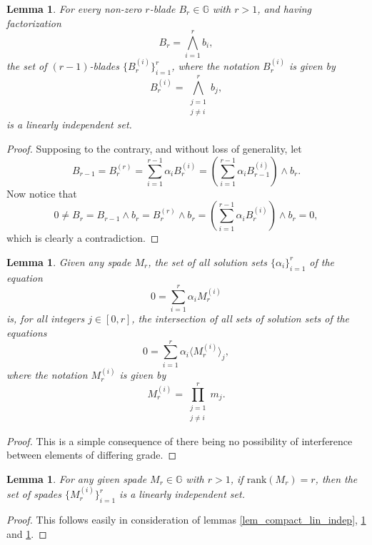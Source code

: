 \documentclass{birkjour}
\newtheorem{lem}[thm]{Lemma}
\theoremstyle{definition}
\theoremstyle{remark}
\numberwithin{equation}{section}
\newcommand{\G}{\mathbb{G}}
\newcommand{\rank}{\mbox{rank}}
\begin{document}
\begin{lem}\label{lem_lin_indep_subblades}
For every non-zero $r$-blade $B_r\in\G$ with $r>1$, and having factorization
\begin{equation*}
B_r = \bigwedge_{i=1}^r b_i,
\end{equation*}
the set of $(r-1)$-blades $\{B_r^{(i)}\}_{i=1}^r$, where the notation $B_r^{(i)}$ is given by
\begin{equation*}
B_r^{(i)}=\bigwedge_{\substack{j=1\\j\neq i}}^r b_j,
\end{equation*}
is a linearly independent set.
\end{lem}
\begin{proof}
Supposing to the contrary, and without loss of generality, let
\begin{equation*}
B_{r-1} = B_r^{(r)} = \sum_{i=1}^{r-1}\alpha_i B_r^{(i)} = \left(\sum_{i=1}^{r-1}\alpha_i B_{r-1}^{(i)}\right)\wedge b_r.
\end{equation*}
Now notice that
\begin{equation*}
0\neq B_r = B_{r-1}\wedge b_r = B_r^{(r)}\wedge b_r = \left(\sum_{i=1}^{r-1}\alpha_i B_r^{(i)}\right)\wedge b_r = 0,
\end{equation*}
which is clearly a contradiction.
\end{proof}

\begin{lem}\label{lem_solution_intersection}
Given any spade $M_r$, the set of all solution sets $\{\alpha_i\}_{i=1}^r$ of the equation
\begin{equation*}
0 = \sum_{i=1}^r\alpha_i M_r^{(i)}
\end{equation*}
is, for all integers $j\in[0,r]$, the intersection of all sets of solution sets of the equations
\begin{equation*}
0 = \sum_{i=1}^r\alpha_i\langle M_r^{(i)}\rangle_j,
\end{equation*}
where the notation $M_r^{(i)}$ is given by
\begin{equation*}
M_r^{(i)}=\prod_{\substack{j=1\\j\neq i}}^r m_j.
\end{equation*}
\end{lem}
\begin{proof}
This is a simple consequence of there being no possibility of interference between elements of differing grade.
\end{proof}

\begin{lem}
For any given spade $M_r\in\G$ with $r>1$, if $\rank(M_r)=r$, then
the set of spades $\{M_r^{(i)}\}_{i=1}^r$ is a linearly independent set.
\end{lem}
\begin{proof}
This follows easily in consideration of lemmas \ref{lem_compact_lin_indep}, \ref{lem_lin_indep_subblades} and \ref{lem_solution_intersection}.
\end{proof}

\end{document}
